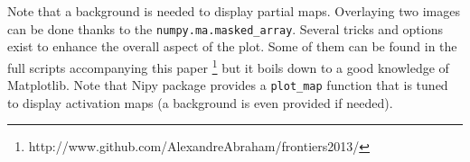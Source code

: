 \documentclass{frontiersSCNS} %
\newcommand{\alex}[1]{\todo[inline, color=green!40]{#1}}
\begin{document}
Note that a background is needed to display partial maps. Overlaying two images
can be done thanks to the \texttt{numpy.ma.masked\_array}.
Several tricks and options exist to enhance the overall aspect of the plot.
Some of them can be found in the full scripts accompanying this paper
\footnote{http://www.github.com/AlexandreAbraham/frontiers2013/} but it 
boils down to a good knowledge of Matplotlib. Note that Nipy package provides a
\texttt{plot\_map} function that is tuned to display activation maps (a
background is even provided if needed).






%


\end{document}
